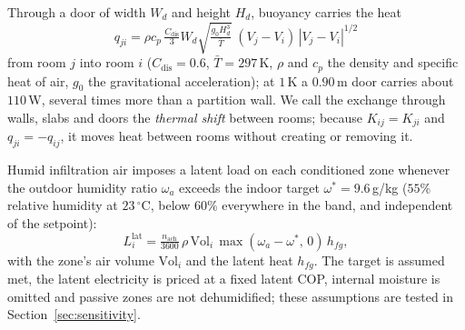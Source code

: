 \documentclass[10pt,a4paper,twocolumn]{article}
\theoremstyle{definition}
\begin{document}
Through a door of width $W_d$ and height $H_d$, buoyancy carries the heat~\citep{brown1962natural}
\begin{equation}\label{eq:door}
q_{ji}=\rho c_p\,\tfrac{C_{\mathrm{dis}}}{3}W_d\sqrt{\tfrac{g_0H_d^3}{\bar T}}\;(V_j-V_i)\,|V_j-V_i|^{1/2}
\end{equation}
from room $j$ into room $i$ ($C_{\mathrm{dis}}=0.6$, $\bar T=297\,$K, $\rho$ and $c_p$ the density and specific heat of air, $g_0$ the gravitational acceleration); at $1\,$K a $0.90\,$m door carries about $110\,$W, several times more than a partition wall. We call the exchange through walls, slabs and doors the \emph{thermal shift} between rooms; because $K_{ij}=K_{ji}$ and $q_{ji}=-q_{ij}$, it moves heat between rooms without creating or removing it.

Humid infiltration air imposes a latent load on each conditioned zone whenever the outdoor humidity ratio $\omega_a$ exceeds the indoor target $\omega^\ast=9.6\,$g/kg ($55\%$ relative humidity at $23\,^{\circ}$C, below $60\%$ everywhere in the band, and independent of the setpoint):
\begin{equation}\label{eq:latent}
L^{\mathrm{lat}}_i = \tfrac{n_{\mathrm{ach}}}{3600}\, \rho\, \mathrm{Vol}_i\, \max(\omega_a - \omega^\ast,\,0)\, h_{fg},
\end{equation}
with the zone's air volume $\mathrm{Vol}_i$ and the latent heat $h_{fg}$. The target is assumed met, the latent electricity is priced at a fixed latent COP, internal moisture is omitted and passive zones are not dehumidified; these assumptions are tested in Section~\ref{sec:sensitivity}.
\end{document}
